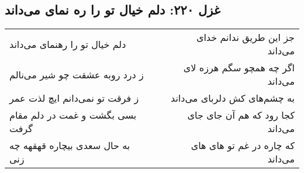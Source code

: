 \begin{center}
\section*{غزل ۲۲۰: دلم خیال تو را ره نمای می‌داند}
\label{sec:220}
\begin{longtable}{l p{0.5cm} r}
دلم خیال تو را رهنمای می‌داند
&&
جز این طریق ندانم خدای می‌داند
\\
ز درد روبه عشقت چو شیر می‌نالم
&&
اگر چه همچو سگم هرزه لای می‌داند
\\
ز فرقت تو نمی‌دانم ایچ لذت عمر
&&
به چشم‌های کش دلربای می‌داند
\\
بسی بگشت و غمت در دلم مقام گرفت
&&
کجا رود که هم آن جای جای می‌داند
\\
به حال سعدی بیچاره قهقهه چه زنی
&&
که چاره در غم تو های های می‌داند
\\
\end{longtable}
\end{center}
